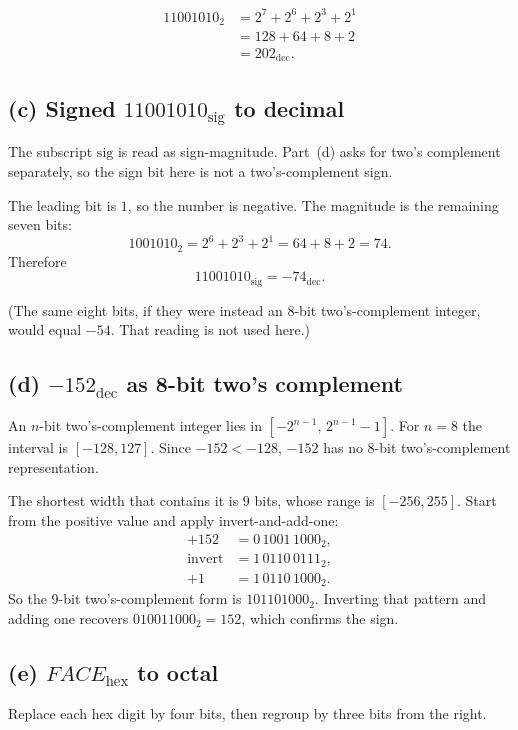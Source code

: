\documentclass[11pt,a4paper]{article}
\begin{document}
\[
\begin{aligned}
11001010_{2}
&= 2^{7}+2^{6}+2^{3}+2^{1} \\
&= 128+64+8+2 \\
&= 202_{\mathrm{dec}}.
\end{aligned}
\]

\subsection*{(c) Signed \(11001010_{\mathrm{sig}}\) to decimal}

The subscript \(\mathrm{sig}\) is read as sign-magnitude.
Part~(d) asks for two's complement separately, so the sign bit here is not a two's-complement sign.

The leading bit is \(1\), so the number is negative.
The magnitude is the remaining seven bits:
\[
1001010_{2}=2^{6}+2^{3}+2^{1}=64+8+2=74.
\]
Therefore
\[
11001010_{\mathrm{sig}}=-74_{\mathrm{dec}}.
\]

(The same eight bits, if they were instead an 8-bit two's-complement integer, would equal \(-54\). That reading is not used here.)

\subsection*{(d) \(-152_{\mathrm{dec}}\) as 8-bit two's complement}

An \(n\)-bit two's-complement integer lies in \([-2^{n-1},\,2^{n-1}-1]\).
For \(n=8\) the interval is \([-128,127]\).
Since \(-152<-128\), \(-152\) has no 8-bit two's-complement representation.

The shortest width that contains it is \(9\) bits, whose range is \([-256,255]\).
Start from the positive value and apply invert-and-add-one:
\[
\begin{aligned}
+152 &= 0\,1001\,1000_{2}, \\
\text{invert} &= 1\,0110\,0111_{2}, \\
+1 &= 1\,0110\,1000_{2}.
\end{aligned}
\]
So the 9-bit two's-complement form is \(101101000_{2}\).
Inverting that pattern and adding one recovers \(010011000_{2}=152\), which confirms the sign.

\subsection*{(e) \(FACE_{\mathrm{hex}}\) to octal}

Replace each hex digit by four bits, then regroup by three bits from the right.
\end{document}
